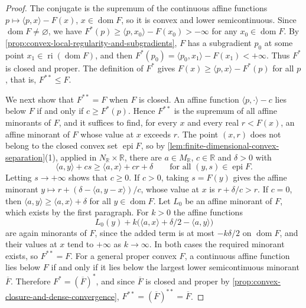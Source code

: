 \begin{proof}
The conjugate is the supremum of the continuous affine functions $p\mapsto\langle p,x\rangle-F(x)$, $x\in\operatorname{dom}F$, so it is convex and lower semicontinuous. Since $\operatorname{dom}F\neq\varnothing$, we have $F^*(p)\geq\langle p,x_0\rangle-F(x_0)>-\infty$ for any $x_0\in\operatorname{dom}F$. By \cref{prop:convex-local-regularity-and-subgradients}, $F$ has a subgradient $p_0$ at some point $x_1\in\operatorname{ri}(\operatorname{dom}F)$, and then $F^*(p_0)=\langle p_0,x_1\rangle-F(x_1)<+\infty$. Thus $F^*$ is closed and proper. The definition of $F^*$ gives $F(x)\geq\langle p,x\rangle-F^*(p)$ for all $p$, that is, $F^{**}\leq F$.

We next show that $F^{**}=F$ when $F$ is closed. An affine function $\langle p,\cdot\rangle-c$ lies below $F$ if and only if $c\geq F^*(p)$. Hence $F^{**}$ is the supremum of all affine minorants of $F$, and it suffices to find, for every $x$ and every real $r<F(x)$, an affine minorant of $F$ whose value at $x$ exceeds $r$. The point $(x,r)$ does not belong to the closed convex set $\operatorname{epi}F$, so by \cref{lem:finite-dimensional-convex-separation}(1), applied in $N_{\mathbb R}\times\mathbb R$, there are $a\in M_{\mathbb R}$, $c\in\mathbb R$ and $\delta>0$ with
\[
 \langle a,y\rangle+cs\geq\langle a,x\rangle+cr+\delta
                  \qquad\text{for all }(y,s)\in\operatorname{epi}F.
\]
Letting $s\to+\infty$ shows that $c\geq0$. If $c>0$, taking $s=F(y)$ gives the affine minorant $y\mapsto r+(\delta-\langle a,y-x\rangle)/c$, whose value at $x$ is $r+\delta/c>r$. If $c=0$, then $\langle a,y\rangle\geq\langle a,x\rangle+\delta$ for all $y\in\operatorname{dom}F$. Let $L_0$ be an affine minorant of $F$, which exists by the first paragraph. For $k>0$ the affine functions
\[
 L_0(y)+k\bigl(\langle a,x\rangle+\delta/2-\langle a,y\rangle\bigr)
\]
are again minorants of $F$, since the added term is at most $-k\delta/2$ on $\operatorname{dom}F$, and their values at $x$ tend to $+\infty$ as $k\to\infty$. In both cases the required minorant exists, so $F^{**}=F$. For a general proper convex $F$, a continuous affine function lies below $F$ if and only if it lies below the largest lower semicontinuous minorant $\overline F$. Therefore $F^*=(\overline F)^*$, and since $\overline F$ is closed and proper by \cref{prop:convex-closure-and-dense-convergence}, $F^{**}=(\overline F)^{**}=\overline F$.


\end{proof}
